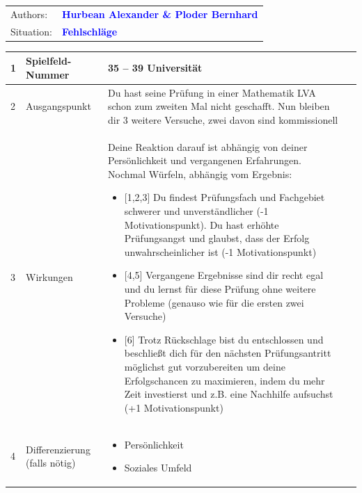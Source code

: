 \documentclass[12pt, a4paper]{article}
\newcommand{\authortext}{Hurbean Alexander \& Ploder Bernhard}
\newcommand{\situation}{Fehlschläge}
\begin{document}
\begin{tabular}{l l} 
Authors: & \textbf{\textcolor{blue}{\large\authortext}}\\ 
Situation: & \textbf{\textcolor{blue}{\large\situation}}
\end{tabular}

\vspace{1em}

\centerline{
	}

\vspace{1em}

\begin{table}[h!]
	\begin{tabularx}{\textwidth}{|p{0.3cm}|p{3.5cm}|X|p{0.3cm}|}
		\hline
		1 & Spielfeld-Nummer                       & 35 – 39 Universität &  \\
		\hline
		2 & Ausgangspunkt                          & 
		Du hast seine Prüfung in einer Mathematik LVA schon zum zweiten Mal nicht geschafft.
		Nun bleiben dir 3 weitere Versuche, zwei davon sind kommissionell &  \\
		\hline
		3 & Wirkungen                              &
		Deine Reaktion darauf ist abhängig von deiner Persönlichkeit und vergangenen Erfahrungen. Nochmal Würfeln, abhängig vom Ergebnis:
		\begin{itemize}[noitemsep, topsep=0pt]
			\item {[1,2,3]} Du findest Prüfungsfach und Fachgebiet schwerer und unverständlicher (-1 Motivationspunkt).	Du hast erhöhte Prüfungsangst und glaubst, dass der Erfolg unwahrscheinlicher ist (-1 Motivationspunkt)
			\item {[4,5]} Vergangene Ergebnisse sind dir recht egal und du lernst für diese Prüfung ohne weitere Probleme (genauso wie für die ersten zwei Versuche)
			\item {[6]} Trotz Rückschlage bist du entschlossen und beschließt dich für den nächsten Prüfungsantritt möglichst gut vorzubereiten um deine Erfolgschancen zu maximieren, indem du mehr Zeit investierst und z.B. eine Nachhilfe aufsuchst (+1 Motivationspunkt)
		\end{itemize} &  \\
		\hline
		4 & Differenzierung \newline (falls nötig) & 
		\begin{itemize}[noitemsep, topsep=0pt]
			\item Persönlichkeit
			\item Soziales Umfeld

\end{itemize}
\end{tabularx}
\end{table}
\end{document}
